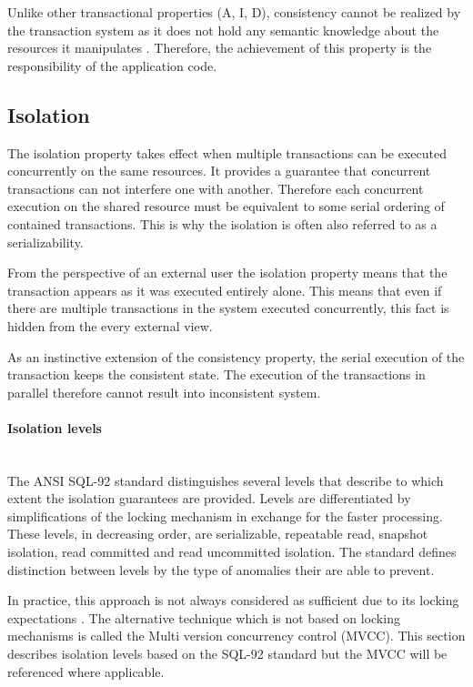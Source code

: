\documentclass[oneside,
  digital, %
  table,   %
  nolof,     %
  nolot,     %
]{fithesis3}
\newcommand{\newlinepar}[1]{\paragraph{#1}\needspace{4\baselineskip}\mbox{}\\}
\begin{document}
Unlike other transactional properties (A, I, D), consistency cannot be realized by the transaction system as it does not hold any semantic knowledge about the resources it manipulates \cite{java_tran_processing}. Therefore, the achievement of this property is the responsibility of the application code.

\subsection{Isolation}

The isolation property takes effect when multiple transactions can be executed concurrently on the same resources. It provides a guarantee that concurrent transactions can not interfere one with another. Therefore each concurrent execution on the shared resource must be equivalent to some serial ordering of contained transactions. This is why the isolation is often also referred to as a serializability.

From the perspective of an external user the isolation property means that the transaction appears as it was executed entirely alone. This means that even if there are multiple transactions in the system executed concurrently, this fact is hidden from the every external view.

As an instinctive extension of the consistency property, the serial execution of the transaction keeps the consistent state. The execution of the transactions in parallel therefore cannot result into inconsistent system.

\newlinepar{Isolation levels}

The ANSI SQL-92 \cite{sql-92} standard distinguishes several levels that describe to which extent the isolation guarantees are provided. Levels are differentiated by simplifications of the locking mechanism in exchange for the faster processing. These levels, in decreasing order, are serializable, repeatable read, snapshot isolation, read committed and read uncommitted isolation. The standard defines distinction between levels by the type of anomalies their are able to prevent. 

In practice, this approach is not always considered as sufficient due to its locking expectations \cite{ansi-sql-critique}. The alternative technique which is not based on locking mechanisms is called the Multi version concurrency control (MVCC). This section describes isolation levels based on the SQL-92 standard but the MVCC will be referenced where applicable.
\end{document}
